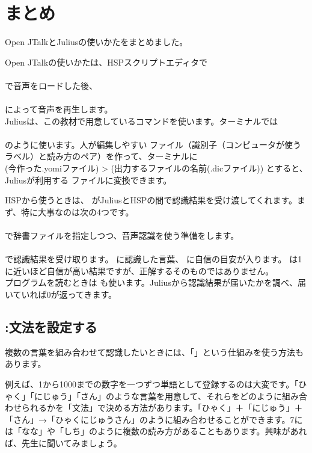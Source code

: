\documentclass[text06.tex]{subfiles}
\begin{document}
\newpage
\section{まとめ}
Open JTalkとJuliusの使いかたをまとめました。

Open JTalkの使いかたは、HSPスクリプトエディタで\\
\\
で音声をロードした後、\\
\\
によって音声を再生します。\\

Juliusは、この教材で用意しているコマンドを使います。ターミナルでは\\
\\
のように使います。人が編集しやすい  ファイル（識別子（コンピュータが使うラベル）と読み方のペア）を作って、ターミナルに\\
\mbox{} (今作った.yomiファイル) > (出力するファイルの名前(.dicファイル))
とすると、Juliusが利用する  ファイルに変換できます。

HSPから使うときは、 がJuliusとHSPの間で認識結果を受け渡してくれます。まず、特に大事なのは次の4つです。\\
\\
で辞書ファイルを指定しつつ、音声認識を使う準備をします。\\
\\
で認識結果を受け取ります。 に認識した言葉、 に自信の目安が入ります。 は1に近いほど自信が高い結果ですが、正解するそのものではありません。\\
プログラムを読むときは  も使います。Juliusから認識結果が届いたかを調べ、届いていれば0が返ってきます。

\subsection{:文法を設定する}
複数の言葉を組み合わせて認識したいときには、「」という仕組みを使う方法もあります。

例えば、1から1000までの数字を一つずつ単語として登録するのは大変です。「ひゃく」「にじゅう」「さん」のような言葉を用意して、それらをどのように組み合わせられるかを「文法」で決める方法があります。「ひゃく」＋「にじゅう」＋「さん」→「ひゃくにじゅうさん」のように組み合わせることができます。7には「なな」や「しち」のように複数の読み方があることもあります。興味があれば、先生に聞いてみましょう。
\end{document}
